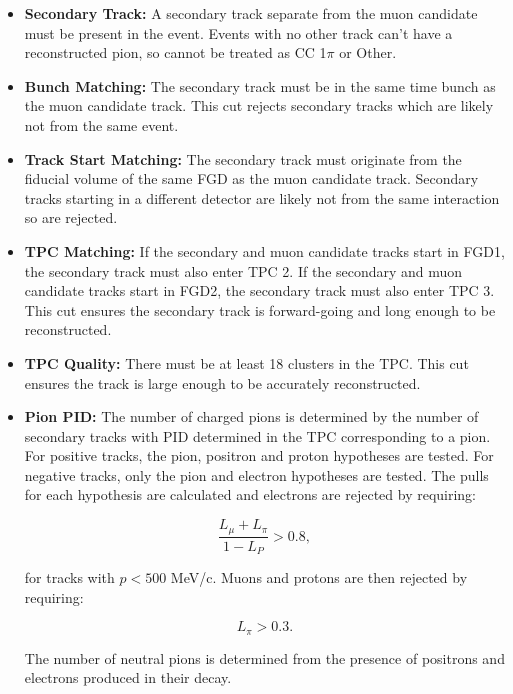 \begin{itemize}

\item \textbf{Secondary Track:} A secondary track separate from the muon candidate must be present in the event. Events with no other track can't have a reconstructed pion, so cannot be treated as CC 1$\pi$ or Other.

\item \textbf{Bunch Matching:} The secondary track must be in the same time bunch as the muon candidate track. This cut rejects secondary tracks which are likely not from the same event.

\item \textbf{Track Start Matching:} The secondary track must originate from the fiducial volume of the same FGD as the muon candidate track. Secondary tracks starting in a different detector are likely not from the same interaction so are rejected.

\item \textbf{TPC Matching:} If the secondary and muon candidate tracks start in FGD1, the secondary track must also enter TPC 2. If the secondary and muon candidate tracks start in FGD2, the secondary track must also enter TPC 3. This cut ensures the secondary track is forward-going and long enough to be reconstructed.

\item \textbf{TPC Quality:} There must be at least 18 clusters in the TPC. This cut ensures the track is large enough to be accurately reconstructed.

\item \textbf{Pion PID:} The number of charged pions is determined by the number of secondary tracks with PID determined in the TPC corresponding to a pion. For positive tracks, the pion, positron and proton hypotheses are tested. For negative tracks, only the pion and electron hypotheses are tested. The pulls for each hypothesis are calculated and electrons are rejected by requiring:

\begin{equation}
\frac{L_{\mu}+L_{\pi}}{1-L_P} > 0.8,
\end{equation}

for tracks with $p < 500$ MeV/c. Muons and protons are then rejected by requiring:

\begin{equation}
L_{\pi} > 0.3.
\end{equation}

The number of neutral pions is determined from the presence of positrons and electrons produced in their decay.


\end{itemize}
